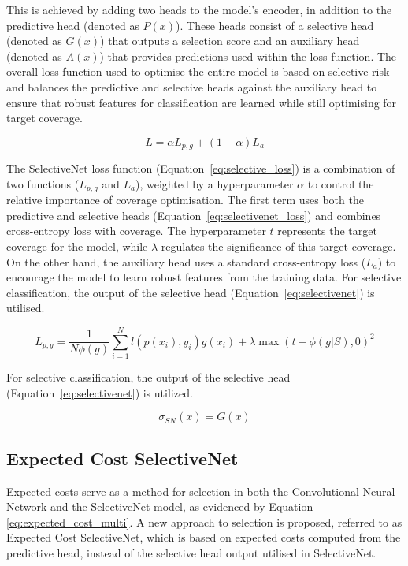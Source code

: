 This is achieved by adding two heads to the model's encoder, in addition to the predictive head (denoted as $P(x)$). These heads consist of a selective head (denoted as $G(x)$) that outputs a selection score and an auxiliary head (denoted as $A(x)$) that provides predictions used within the loss function. The overall loss function used to optimise the entire model is based on selective risk and balances the predictive and selective heads against the auxiliary head to ensure that robust features for classification are learned while still optimising for target coverage.

\begin{equation}
	L = \alpha L_{p, g} + (1 - \alpha)L_a
	\label{eq:selective_loss}
\end{equation}

The SelectiveNet loss function (Equation~\ref{eq:selective_loss}) is a combination of two functions ($L_{p,g}$ and $L_a$), weighted by a hyperparameter $\alpha$ to control the relative importance of coverage optimisation. The first term uses both the predictive and selective heads (Equation~\ref{eq:selectivenet_loss}) and combines cross-entropy loss with coverage. The hyperparameter $t$ represents the target coverage for the model, while $\lambda$ regulates the significance of this target coverage. On the other hand, the auxiliary head uses a standard cross-entropy loss ($L_a$) to encourage the model to learn robust features from the training data. For selective classification, the output of the selective head (Equation~\ref{eq:selectivenet}) is utilised.

\begin{equation}
	L_{p, g} = \frac{1}{N \phi(g)}\sum^{N}_{i=1}l(p(x_i), y_i) g(x_i) + \lambda\max(t - \phi(g|S), 0)^2
	\label{eq:selectivenet_loss}
\end{equation}

\noindent For selective classification, the output of the selective head (Equation~\ref{eq:selectivenet}) is utilized.

\begin{equation}
	\sigma_{SN}(x) = G(x)
	\label{eq:selectivenet}
\end{equation}

\subsection{Expected Cost SelectiveNet}
\label{subsec:ec_selectivenet}
Expected costs serve as a method for selection in both the Convolutional Neural Network and the SelectiveNet model, as evidenced by Equation \ref{eq:expected_cost_multi}. A new approach to selection is proposed, referred to as Expected Cost SelectiveNet, which is based on expected costs computed from the predictive head, instead of the selective head output utilised in SelectiveNet.

